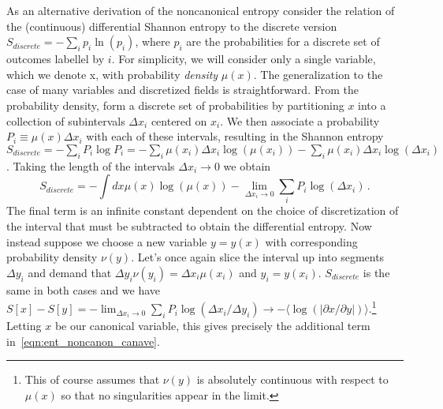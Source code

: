 \documentclass[11pt,a4paper]{article}
\begin{document}
As an alternative derivation of the noncanonical entropy consider the relation of the (continuous) differential Shannon entropy to the discrete version $S_{discrete}=-\sum_ip_i\ln(p_i)$, where $p_i$ are the probabilities for a discrete set of outcomes labellel by $i$.
For simplicity, we will consider only a single variable, which we denote x, with probability \emph{density} $\mu(x)$.  The generalization to the case of many variables and discretized fields is straightforward.
From the probability density, form a discrete set of probabilities by partitioning $x$ into a collection of subintervals $\Delta x_i$ centered on $x_i$.
We then associate a probability $P_i \equiv \mu(x)\Delta x_i$ with each of these intervals, resulting in the Shannon entropy 
$S_{discrete} = -\sum_i P_i\log P_i = -\sum_i \mu(x_i)\Delta x_i\log(\mu(x_i)) - \sum_i\mu(x_i)\Delta x_i\log(\Delta x_i)$.
Taking the length of the intervals $\Delta x_i \to 0$ we obtain
\begin{equation}
  S_{discrete} = -\int dx\mu(x)\log(\mu(x)) - \lim_{\Delta x_i \to 0}\sum_iP_i\log(\Delta x_i) \, .
\end{equation}
The final term is an infinite constant dependent on the choice of discretization of the interval that must be subtracted to obtain the differential entropy.
Now instead suppose we choose a new variable $y=y(x)$ with corresponding probability density $\nu(y)$.
Let's once again slice the interval up into segments $\Delta y_i$ and demand that $\Delta y_i\nu(y_i) = \Delta x_i\mu(x_i)$ and $y_i=y(x_i)$.
$S_{discrete}$ is the same in both cases and we have $S[x]-S[y] = -\lim_{\Delta x_i \to 0} \sum_iP_i\log(\Delta x_i/\Delta y_i) \to -\langle\log(|\partial x/\partial y|)\rangle$.\footnote{This of course assumes that $\nu(y)$ is absolutely continuous with respect to $\mu(x)$ so that no singularities appear in the limit.}
Letting $x$ be our canonical variable, this gives precisely the additional term in~\eqref{eqn:ent_noncanon_canave}.
\end{document}
